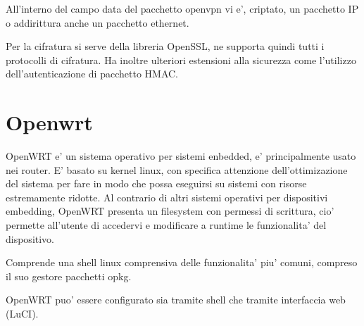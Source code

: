 All'interno del campo data del pacchetto openvpn vi e', criptato, un pacchetto IP o addirittura anche un pacchetto ethernet.

Per la cifratura si serve della libreria OpenSSL, ne supporta quindi tutti i protocolli di cifratura. Ha inoltre ulteriori estensioni alla sicurezza come l'utilizzo dell'autenticazione di pacchetto HMAC.


\section{Openwrt}

OpenWRT e' un sistema operativo per sistemi enbedded, e' principalmente usato nei router. E' basato su kernel linux, con specifica attenzione dell'ottimizazione del sistema per fare in modo che possa eseguirsi su sistemi con risorse estremamente ridotte.
Al contrario di altri sistemi operativi per dispositivi embedding, OpenWRT presenta un filesystem con permessi di scrittura, cio' permette all'utente di accedervi e modificare a runtime le funzionalita' del dispositivo.

Comprende una shell linux comprensiva delle funzionalita' piu' comuni, compreso il suo gestore pacchetti opkg.

OpenWRT puo' essere configurato sia tramite shell che tramite interfaccia web (LuCI).


